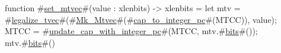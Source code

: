function #\hyperref[sailRISCVzsetzymtvec]{set\_mtvec}#(value : xlenbits) -> xlenbits = {
  let mtv = #\hyperref[sailRISCVzlegalizzezytvec]{legalize\_tvec}#(#\hyperref[sailRISCVzMkzyMtvec]{Mk\_Mtvec}#(#\hyperref[sailRISCVzcapzytozyintegerzypc]{cap\_to\_integer\_pc}#(MTCC)), value);
  MTCC = #\hyperref[sailRISCVzupdatezycapzywithzyintegerzypc]{update\_cap\_with\_integer\_pc}#(MTCC, mtv.#\hyperref[sailRISCVzbits]{bits}#());
  mtv.#\hyperref[sailRISCVzbits]{bits}#()
}
